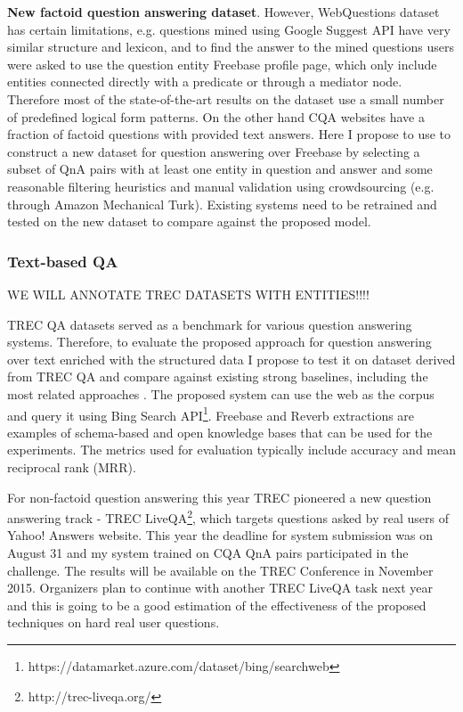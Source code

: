 \textbf{New factoid question answering dataset}.
However, WebQuestions dataset has certain limitations, e.g. questions mined using Google Suggest API have very similar structure and lexicon, and to find the answer to the mined questions users were asked to use the question entity Freebase profile page,  which only include entities connected directly with a predicate or through a mediator node.
Therefore most of the state-of-the-art results on the dataset use a small number of predefined logical form patterns.
On the other hand CQA websites have a fraction of factoid questions with provided text answers.
Here I propose to use to construct a new dataset for question answering over Freebase by selecting a subset of QnA pairs with at least one entity in question and answer and some reasonable filtering heuristics and manual validation using crowdsourcing (e.g. through Amazon Mechanical Turk).
Existing systems need to be retrained and tested on the new dataset to compare against the proposed model.

\subsubsection{Text-based QA}

WE WILL ANNOTATE TREC DATASETS WITH ENTITIES!!!!

TREC QA datasets served as a benchmark for various question answering systems.
Therefore, to evaluate the proposed approach for question answering over text enriched with the structured data I propose to test it on dataset derived from TREC QA and compare against existing strong baselines, including the most related approaches \cite{Fader:2014:OQA:2623330.2623677,Sun:2015:ODQ:2736277.2741651}.
The proposed system can use the web as the corpus and query it using Bing Search API\footnote{https://datamarket.azure.com/dataset/bing/searchweb}.
Freebase and Reverb extractions \cite{FaderSE11} are examples of schema-based and open knowledge bases that can be used for the experiments.
The metrics used for evaluation typically include accuracy and mean reciprocal rank (MRR).

For non-factoid question answering this year TREC pioneered a new question answering track - TREC LiveQA\footnote{http://trec-liveqa.org/}, which targets questions asked by real users of Yahoo! Answers website.
This year the deadline for system submission was on August 31 and my system trained on CQA QnA pairs participated in the challenge.
The results will be available on the TREC Conference in November 2015.
Organizers plan to continue with another TREC LiveQA task next year and this is going to be a good estimation of the effectiveness of the proposed techniques on hard real user questions.


